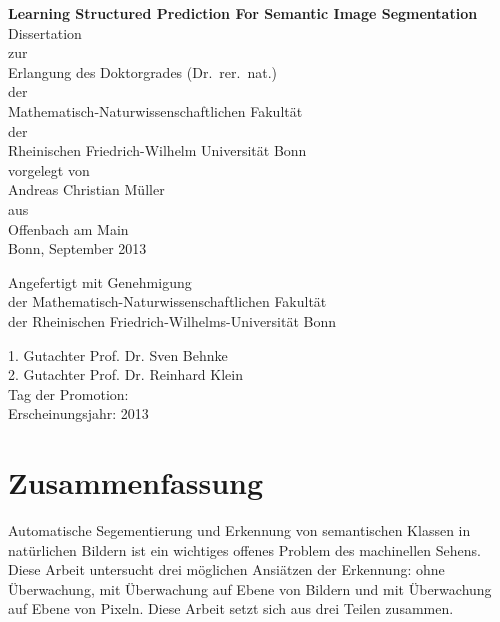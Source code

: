 \documentclass[12pt,toc=bibnumbered, a4paper,twoside,DIV=11,BCOR=.5cm]{scrbook}
\begin{document}
\begin{spacing}{1.6}
\begin{titlepage}

\begin{center}
\Large\sffamily
\vspace*{1cm}
\textbf{{\huge Learning Structured Prediction For Semantic Image Segmentation}}\\[5mm]
Dissertation\\%
zur\\%
Erlangung des Doktorgrades (Dr.\ rer.\ nat.)\\%
der\\%
Mathematisch-Naturwissenschaftlichen Fakult\"at\\%
der\\%
Rheinischen Friedrich-Wilhelm Universit\"at Bonn\\%
vorgelegt von\\%
{\LARGE Andreas Christian M\"uller}\\%
aus\\%
Offenbach am Main\\%
Bonn, September 2013
\end{center}
\end{titlepage}
%
\clearpage
{}
\setcounter{page}{2}
\vspace*{5cm}
\Large\sffamily
\begin{center}
Angefertigt mit Genehmigung\\
der Mathematisch-Naturwissenschaftlichen Fakult\"at\\
der Rheinischen Friedrich-Wilhelms-Universit\"at Bonn\\
\end{center}
1. Gutachter Prof. Dr. Sven Behnke\\
2. Gutachter Prof. Dr. Reinhard Klein\\
Tag der Promotion:\\
Erscheinungsjahr: 2013\\
\end{spacing}
\tableofcontents
\chapter*{Zusammenfassung}
Automatische Segementierung und Erkennung von semantischen Klassen in
nat\"urlichen Bildern ist ein wichtiges offenes Problem des machinellen Sehens.
Diese Arbeit untersucht drei m\"oglichen Ansi\"atzen der Erkennung:
ohne \"Uberwachung, mit \"Uberwachung auf Ebene von Bildern und mit \"Uberwachung auf Ebene
von Pixeln. Diese Arbeit setzt sich aus drei Teilen zusammen.
\end{document}
